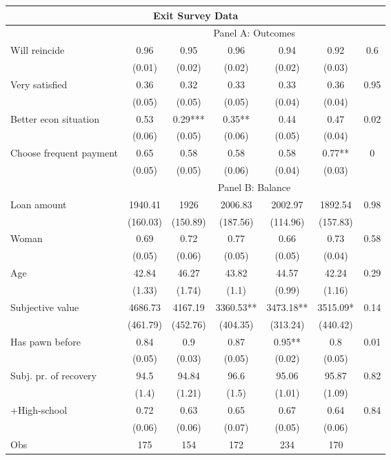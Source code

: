\begin{tabular}{lcccccc}
\hline
\multicolumn{7}{c}{Exit Survey Data} \bigstrut\\
\hline
\hline
   & \multicolumn{6}{c}{Panel A: Outcomes} \bigstrut\\
\hline
\hline
Will reincide & 0.96 & 0.95 & 0.96 & 0.94 & 0.92 & 0.6 \bigstrut[t]\\
   & (0.01) & (0.02) & (0.02) & (0.02) & (0.03) &  \\
Very satisfied & 0.36 & 0.32 & 0.33 & 0.33 & 0.36 & 0.95 \\
   & (0.05) & (0.05) & (0.05) & (0.04) & (0.04) &  \\
Better econ situation & 0.53 & 0.29*** & 0.35** & 0.44 & 0.47 & 0.02 \\
   & (0.06) & (0.05) & (0.06) & (0.05) & (0.04) &  \\
Choose frequent payment & 0.65 & 0.58 & 0.58 & 0.58 & 0.77** & 0 \\
   & (0.05) & (0.05) & (0.06) & (0.04) & (0.03) &  \bigstrut[b]\\
\hline
   & \multicolumn{6}{c}{Panel B: Balance} \bigstrut\\
\hline
\hline
Loan amount  & 1940.41 & 1926 & 2006.83 & 2002.97 & 1892.54 & 0.98 \bigstrut[t]\\
   & (160.03) & (150.89) & (187.56) & (114.96) & (157.83) &  \\
Woman & 0.69 & 0.72 & 0.77 & 0.66 & 0.73 & 0.58 \\
   & (0.05) & (0.06) & (0.05) & (0.05) & (0.04) &  \\
Age & 42.84 & 46.27 & 43.82 & 44.57 & 42.24 & 0.29 \\
   & (1.33) & (1.74) & (1.1) & (0.99) & (1.16) &  \\
Subjective value & 4686.73 & 4167.19 & 3360.53** & 3473.18** & 3515.09* & 0.14 \\
   & (461.79) & (452.76) & (404.35) & (313.24) & (440.42) &  \\
Has pawn before & 0.84 & 0.9 & 0.87 & 0.95** & 0.8 & 0.01 \\
   & (0.05) & (0.03) & (0.05) & (0.02) & (0.05) &  \\
Subj. pr. of recovery & 94.5 & 94.84 & 96.6 & 95.06 & 95.87 & 0.82 \\
   & (1.4) & (1.21) & (1.5) & (1.01) & (1.09) &  \\
+High-school & 0.72 & 0.63 & 0.65 & 0.67 & 0.64 & 0.84 \\
   & (0.06) & (0.06) & (0.07) & (0.05) & (0.06) &  \\
Obs & 175 & 154 & 172 & 234 & 170 &  \bigstrut[b]\\
\hline
\hline
\end{tabular}%
